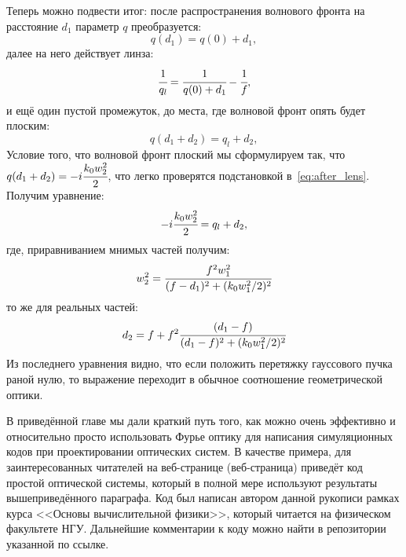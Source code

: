 Теперь можно подвести итог: после распространения волнового фронта на расстояние $d_1$ параметр $q$ преобразуется:
\begin{equation}
	q(d_1) = q(0) + d_1, 
\end{equation}
далее на него действует линза: 
\begin{equation}
	\cfrac{1}{q_l} = \cfrac{1}{q(0) + d_1} - \cfrac{1}{f},
\end{equation}
и ещё один пустой промежуток, до места, где волновой фронт опять будет плоским: 
\begin{equation}
	q(d_1 + d_2) = q_l + d_2, 
\end{equation}
Условие того, что волновой фронт плоский мы сформулируем так, что $q(d_1 + d_2) = -i\cfrac{k_0w^2_2}{2}$, что легко проверятся подстановкой в~\ref{eq:after_lens}. Получим уравнение: 
\begin{equation}
	-i\cfrac{k_0w^2_2}{2} = q_l + d_2, 
\end{equation}
где, приравниванием мнимых частей получим: 
\begin{equation}
	w^2_2 = \cfrac{f^2w^2_1}{(f - d_1)^2 + (k_0w^2_1/2)^2}
\end{equation}
то же для реальных частей: 
\begin{equation}
	d_2 = f + f^2\cfrac{(d_1 - f)}{(d_1 - f)^2 + (k_0w^2_1/2)^2}
\end{equation}
Из последнего уравнения видно, что если положить перетяжку гауссового пучка раной нулю, то выражение переходит в обычное соотношение геометрической оптики.

В приведённой главе мы дали краткий путь того, как можно очень эффективно и относительно просто использовать Фурье оптику для написания симуляционных кодов при проектировании оптических систем. В качестве примера, для заинтересованных читателей на веб-странице (веб-страница) приведёт код простой оптической системы, который в полной мере используют результаты вышеприведённого параграфа. Код был написан автором данной рукописи рамках курса <<Основы вычислительной физики>>, который читается на физическом факультете НГУ. Дальнейшие комментарии к коду можно найти в репозитории указанной по ссылке.
